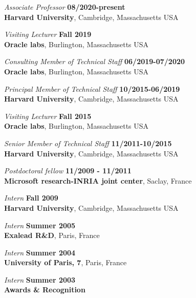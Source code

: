 \documentclass[margin,line]{res}
\begin{document}
\begin{resume}
{\em Associate Professor} \hfill {\bf 08/2020-present}\\
{\bf Harvard University}, Cambridge, Massachusetts USA
\vspace{-.4cm}

{\em Visiting Lecturer} \hfill {\bf Fall 2019}\\
{\bf Oracle labs}, Burlington, Massachusetts USA
\vspace{-.4cm}

{\em Consulting Member of Technical Staff} \hfill {\bf 06/2019-07/2020}\\
{\bf Oracle labs}, Burlington, Massachusetts USA
\vspace{-.4cm}

{\em Principal Member of Technical Staff} \hfill {\bf 10/2015-06/2019}\\
{\bf Harvard University}, Cambridge, Massachusetts USA
\vspace{-.4cm}

{\em Visiting Lecturer} \hfill {\bf Fall 2015}\\
{\bf Oracle labs}, Burlington, Massachusetts USA
\vspace{-.4cm}

{\em Senior Member of Technical Staff} \hfill {\bf 11/2011-10/2015}\\
       {\bf Harvard University}, Cambridge, Massachusetts USA
\vspace{-.4cm}

{\em Postdoctoral fellow} \hfill {\bf 11/2009 - 11/2011}\\
{\bf Microsoft research-INRIA joint center}, Saclay, France
\vspace{-.4cm}

{\em Intern} \hfill {\bf Fall 2009}\\
{\bf Harvard University}, Cambridge, Massachusetts USA

\vspace{-.4cm}
{\em Intern} \hfill {\bf Summer 2005}\\
{\bf Exalead R\&D}, Paris, France

\vspace{-.4cm}
{\em Intern} \hfill {\bf Summer 2004}\\
{\bf University of Paris, 7}, Paris, France

\vspace{-.4cm}
{\em Intern} \hfill {\bf Summer 2003}\\

\newpage
{\bf {\Large Awards \& Recognition}}


\end{resume}
\end{document}
